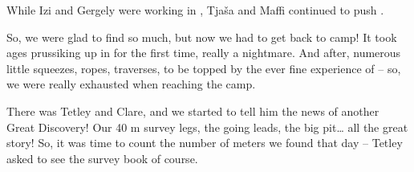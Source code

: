 \begin{marginfigure}
\checkoddpage \ifoddpage \forcerectofloat \else \forceversofloat \fi
\centering
 \caption{While Izi and Gergely were working in , Tjaša and Maffi continued to push . }
 \label{tjasa bolt}
\end{marginfigure}

So, we were glad to find so much, but now we had to get back to camp! It
took ages prussiking up in  for the first time,
really a nightmare. And after, numerous little squeezes, ropes,
traverses, to be topped by the ever fine experience of  --
so, we were really exhausted when reaching the camp.

There was Tetley and Clare, and we started to tell him the news of
another Great Discovery! Our 40 m survey legs, the going leads, the big
pit\ldots{} all the great story! So, it was time to count the number of
meters we found that day -- Tetley asked to see the survey book of course.

